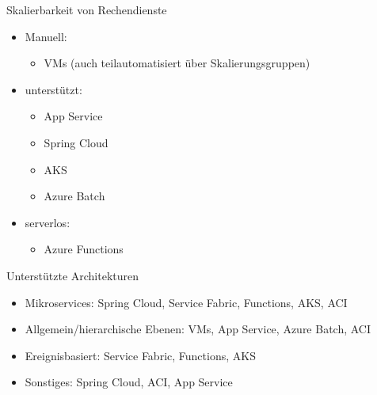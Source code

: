 \begin{flashcard}[]{Skalierbarkeit von Rechendienste}
  \begin{itemize}
    \item Manuell:
      \begin{itemize}
        \item VMs (auch teilautomatisiert über Skalierungsgruppen)
      \end{itemize}
    \item unterstützt:
      \begin{itemize}
        \item App Service
        \item Spring Cloud
        \item AKS
        \item Azure Batch
      \end{itemize}
    \item serverlos:
      \begin{itemize}
        \item Azure Functions
      \end{itemize}
  \end{itemize}
\end{flashcard}

\begin{flashcard}[]{Unterstützte Architekturen}
  \begin{itemize}
    \item Mikroservices:\newline
      Spring Cloud, Service Fabric, Functions, AKS, ACI
    \item Allgemein/hierarchische Ebenen:\newline
      VMs, App Service, Azure Batch, ACI
    \item Ereignisbasiert:\newline
      Service Fabric, Functions, AKS
    \item Sonstiges:\newline
      Spring Cloud, ACI, App Service
  \end{itemize}
\end{flashcard}


